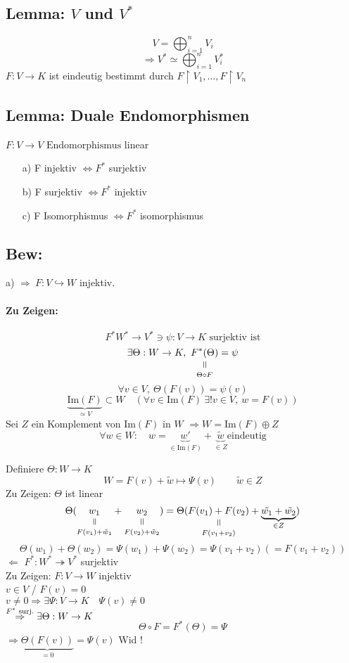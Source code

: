 \documentclass[titlepage,12pt,a4paper,ngerman]{report}
\newcommand{\verteq}{\rotatebox{90}{$\,=$}}
\newcommand{\equalto}[2]{\underset{\scriptstyle\overset{\mkern4mu\verteq}{#2}}{#1}}
\newcommand{\tx}[1]{\textrm{#1}}
\newcommand{\ub}[1]{\underbrace{#1}}
\newcommand{\enph}{F: V \to V \textrm{ Endomorphismus}}
\begin{document}
\subsection{Lemma: $ V $ und $ V^* $}
$$ V = \bigoplus_{i = 1}^{n} V_i$$
$$ \Rightarrow V^* \simeq \bigoplus_{i=1}^{n} V_i^*$$
$ F: V \to K $ ist eindeutig bestimmt durch $ F \upharpoonright V_1, \dots , F \upharpoonright V_n $
\subsection{Lemma: Duale Endomorphismen}
$ \enph $ linear
\begin{itemize}
	\item[a)] F injektiv $ \Leftrightarrow F^* $ surjektiv
	\item[b)] F surjektiv $ \Leftrightarrow F^* $ injektiv
	\item[c)] F Isomorphismus $ \Leftrightarrow F^* $ isomorphismus
\end{itemize}

\subsection{Bew:}
a) $\boxed{\Rightarrow}\ F: V \hookrightarrow W$ injektiv.
\paragraph{Zu Zeigen:} $$F^* W^* \to V^* \ni \psi: V \to K \tx{ surjektiv ist}$$
$$\exists \Theta: W \to K,\ \equalto{F^* (\Theta)}{\Theta \circ F} = \psi$$
$$\forall v \in V,\ \Theta(F(v)) = \psi(v)$$
$$\underbrace{\tx{Im}(F)}_{\simeq V} \subset W \quad (\forall v \in \tx{Im}(F)\ \exists ! v \in V,\ w = F(v))$$
Sei $Z$ ein Komplement von Im$(F)$ in $W$ $\Rightarrow W=$Im$(F) \oplus Z$
$$\forall w \in W: \quad w= \underbrace{w'}_{\in \tx{Im}(F)} + \underbrace{\tilde w}_{\in Z} \tx{eindeutig}$$

Definiere $ \Theta: W \to K $\\
$$ W = F(v) + \tilde{w} \mapsto \Psi(v) \qquad \tilde{w} \in Z$$
Zu Zeigen: $\Theta$ ist linear
$$\Theta(\equalto{w_1}{F(v_1) + \tilde{w}_1} + \equalto{w_2}{F(v_2) + \tilde{w}_2})= \Theta (\equalto{F(v_1) + F(v_2)}{F(v_1+v_2)} + \ub{\tilde{w_1} + \tilde{w_2}}_{\in Z})$$
$$ \Theta(w_1) + \Theta(w_2) = \Psi(w_1) + \Psi(w_2) = \Psi(v_1+v_2) (= F(v_1 + v_2))$$
$\boxed{\Leftarrow}$ $ F^* : W^* \twoheadrightarrow V^* $ surjektiv\\
Zu Zeigen: $ F: V \to W $ injektiv\\
$ v \in V $ / $ F(v) = 0 $\\
$  v \neq 0 \Rightarrow  \exists \Psi:V \to K \quad \Psi(v) \neq 0 $\\
$ \buildrel F^* \tx{ surj.} \over \Rightarrow \exists \Theta : W \to K $
$$ \Theta \circ F = F^*(\Theta) = \Psi $$
$ \Rightarrow \ub{\Theta(F(v))}_{=0} = \Psi(v) $ Wid !
\end{document}
